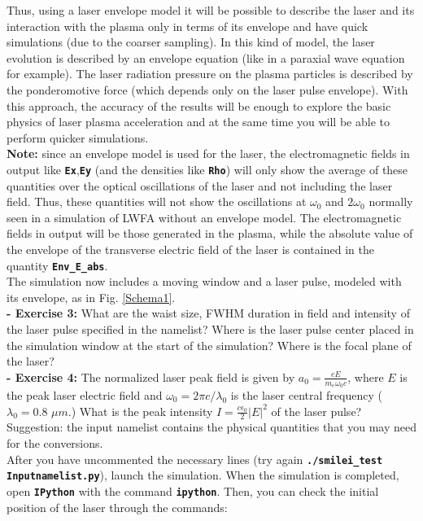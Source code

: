 \documentclass[a4paper,12pt]{extarticle}
\newcommand{\commandline}[1]{\texttt{\textbf{#1}}}
\begin{document}
Thus, using a laser envelope model it will be possible to describe the laser and its interaction with the plasma only in terms of its envelope and have quick simulations (due to the coarser sampling). In this kind of model, the laser evolution is described by an envelope equation (like in a paraxial wave equation for example). The laser radiation pressure on the plasma particles is described by the ponderomotive force (which depends only on the laser pulse envelope). With this approach, the accuracy of the results will be enough to explore the basic physics of laser plasma acceleration and at the same time you will be able to perform quicker simulations. \\

\textbf{ Note:} since an envelope model is used for the laser,  the electromagnetic fields in output like \commandline{Ex},\commandline{Ey} (and the densities like \commandline{Rho}) will only show the average of these quantities over the optical oscillations of the laser and not including the laser field. Thus, these quantities will not show the oscillations at $\omega_0$ and $2\omega_0$ normally seen in a simulation of LWFA without an envelope model. The electromagnetic fields in output will be those generated in the plasma, while the absolute value of the envelope of the transverse electric field of the laser is contained in the quantity \commandline{Env\_E\_abs}. \\

The simulation now includes a moving window and a laser pulse, modeled with its envelope, as in Fig. \ref{Schema1}.\\

\textbf{ - Exercise 3:} What are the waist size, FWHM duration in field and intensity of the laser pulse specified in the namelist? Where is the laser pulse center placed in the simulation window at the start of the simulation? Where is the focal plane of the laser?\\

\textbf{ - Exercise 4:} The normalized laser peak field is given by $a_0=\frac{eE}{m_e\omega_0 c}$, where $E$ is the peak laser electric field and $\omega_0=2\pi c/\lambda_0$ is the laser central frequency ($\lambda_0=0.8$ $\mu m$.) What is the peak intensity $I=\frac{c\epsilon_0}{2}|E|^2$ of the laser pulse? Suggestion: the input namelist contains the physical quantities that you may need for the conversions.\\

After you have uncommented the necessary lines (try again \commandline{./smilei\_test Inputnamelist.py}), launch the simulation.  When the simulation is completed, open \commandline{IPython} with the command \commandline{ipython}. Then, you can check the initial position of the laser through the commands:\\
\end{document}
